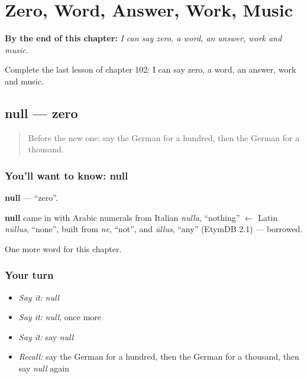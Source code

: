 
\chapter{Zero, Word, Answer, Work, Music}
\label{ch:ge-zero-word-answer-work-music}

\begin{chapteropening}
\textbf{By the end of this chapter:} \emph{I can say zero, a word, an answer, work and music.}

Complete the last lesson of chapter 102: I can say zero, a word, an answer, work and music.
\end{chapteropening}

\section[null]{null — zero}

\label{lesson:GE-C102-null}



\begin{quote}
Before the new one: say the German for a hundred, then the German for a thousand.
\end{quote}

\subsection*{You'll want to know: null}
\textbf{null} — \textquotedblleft{}zero\textquotedblright{}.

\begin{cousinweb}
\textbf{null} came in with Arabic numerals from Italian \emph{nulla}, \textquotedblleft{}nothing\textquotedblright{} $\leftarrow$ Latin \emph{nūllus}, \textquotedblleft{}none\textquotedblright{}, built from \emph{ne}, \textquotedblleft{}not\textquotedblright{}, and \emph{ūllus}, \textquotedblleft{}any\textquotedblright{} (EtymDB 2.1) — borrowed.
\end{cousinweb}

\begin{grammarlens}[title={What you've built}]
One more word for this chapter.
\end{grammarlens}

\subsection*{Your turn}
\begin{itemize}
\raggedright
  \item \emph{Say it:} \emph{null}
  \item \emph{Say it:} \emph{null}, once more
  \item \emph{Say it:} say \emph{null}
  \item \emph{Recall:} say the German for a hundred, then the German for a thousand, then say \emph{null} again
\end{itemize}

